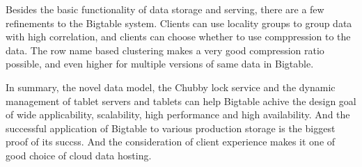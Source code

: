 \documentclass[24pt]{article}
\begin{document}
Besides the basic functionality of data storage and serving, there are
a few refinements to the Bigtable system. Clients can use locality
groups to group data with high correlation, and clients can choose
whether to use comppression to the data. The row name based clustering
makes a very good compression ratio possible, and even higher for
multiple versions of same data in Bigtable. 

In summary, the novel data model, the Chubby lock service and the
dynamic management of tablet servers and tablets can help Bigtable
achive the design goal of wide applicability, scalability, high
performance and high availability. And the successful application of
Bigtable to various production storage is the biggest proof of its
succss. And the consideration of client experience makes it one of
good choice of cloud data hosting. 
\end{document}
